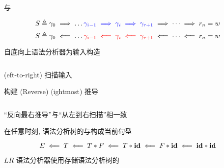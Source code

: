 \begin{frame}{}
  \begin{center}
     与 

    \[
      S \triangleq \gamma_{0} \implies \dots
        \textcolor{blue}{\gamma_{i-1} \implies \gamma_{i} \implies \gamma_{r+1}}
        \implies \dots \implies r_{n} = w
    \]
    \[
      S \triangleq \gamma_{0} \impliedby \dots
        \textcolor{red}{\gamma_{i-1} \impliedby \gamma_{i} \impliedby \gamma_{r+1}}
        \impliedby \dots \impliedby r_{n} = w
    \]

    \vspace{0.80cm}
    自底向上语法分析器为输入构造
  \end{center}
\end{frame}

\begin{frame}{}
  \begin{center}

    \vspace{0.80cm}
    \begin{columns}
        \begin{description}
          \setlength{\itemsep}{15pt}
          \item[$L:$]  (eft-to-right) 扫描输入
          \item[$R:$] 构建 (Reverse)  (ightmost) 推导
        \end{description}
    \end{columns}

    \vspace{0.80cm}
    ``反向最右推导''与``从左到右扫描''相一致
  \end{center}
\end{frame}

\begin{frame}{}
  \begin{center}

    \vspace{0.80cm}
    在任意时刻, 语法分析树的与构成当前句型

    \vspace{0.60cm}
    \[
      E \impliedby T \impliedby T \ast F \impliedby T \ast \text{\bf id} \impliedby F \ast \text{\bf id}
        \impliedby \text{\bf id} \ast \text{\bf id}
    \]

    \vspace{0.60cm}
    $LR$ 语法分析器使用存储语法分析树的
  \end{center}
\end{frame}

